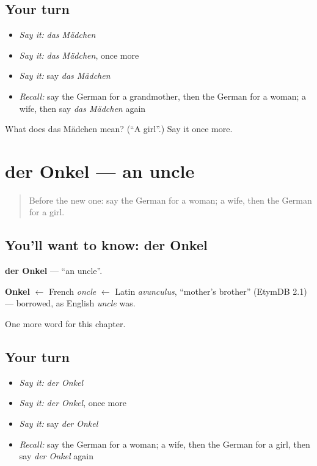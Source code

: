 \subsection*{Your turn}
\begin{itemize}
\raggedright
  \item \emph{Say it:} \emph{das Mädchen}
  \item \emph{Say it:} \emph{das Mädchen}, once more
  \item \emph{Say it:} say \emph{das Mädchen}
  \item \emph{Recall:} say the German for a grandmother, then the German for a woman; a wife, then say \emph{das Mädchen} again
\end{itemize}

\begin{tcolorbox}[breakable,colback=teal!4,colframe=teal!35!black,title={Before you move on}]
What does das Mädchen mean? (\textquotedblleft{}A girl\textquotedblright{}.) Say it once more.
\end{tcolorbox}
\section[der Onkel]{der Onkel — an uncle}

\label{lesson:GE-C62-onkel}



\begin{quote}
Before the new one: say the German for a woman; a wife, then the German for a girl.
\end{quote}

\subsection*{You'll want to know: der Onkel}
\textbf{der Onkel} — \textquotedblleft{}an uncle\textquotedblright{}.

\begin{cousinweb}
\textbf{Onkel} $\leftarrow$ French \emph{oncle} $\leftarrow$ Latin \emph{avunculus}, \textquotedblleft{}mother's brother\textquotedblright{} (EtymDB 2.1) — borrowed, as English \emph{uncle} was.
\end{cousinweb}

\begin{grammarlens}[title={What you've built}]
One more word for this chapter.
\end{grammarlens}

\subsection*{Your turn}
\begin{itemize}
\raggedright
  \item \emph{Say it:} \emph{der Onkel}
  \item \emph{Say it:} \emph{der Onkel}, once more
  \item \emph{Say it:} say \emph{der Onkel}
  \item \emph{Recall:} say the German for a woman; a wife, then the German for a girl, then say \emph{der Onkel} again
\end{itemize}


